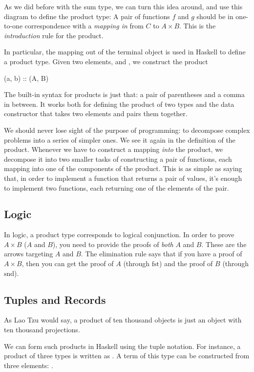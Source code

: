 \documentclass[DaoFP]{subfiles}
\begin{document}
As we did before with the sum type, we can turn this idea around, and use this diagram to define the product type: A pair of functions $f$ and $g$ should be in one-to-one correspondence with a \emph{mapping in} from $C$ to $A \times B$. This is the \emph{introduction} rule for the product.

In particular, the mapping out of the terminal object is used in Haskell to define a product type. Given two elements,  and , we construct the product 

\begin{haskell}
(a, b) :: (A, B)
\end{haskell}
The built-in syntax for products is just that: a pair of parentheses and a comma in between. It works both for defining the product of two types  and the data constructor  that takes two elements and pairs them together. 

We should never lose sight of the purpose of programming: to decompose complex problems into a series of simpler ones. We see it again in the definition of the product. Whenever we have to construct a mapping \emph{into} the product, we decompose it into two smaller tasks of constructing a pair of functions, each mapping into one of the components of the product. This is as simple as saying that, in order to implement a function that returns a pair of values, it's enough to implement two functions, each returning one of the elements of the pair.

\subsection{Logic}

In logic, a product type corresponds to logical conjunction. In order to prove $A \times B$ ($A$ and $B$), you need to provide the proofs of \emph{both} $A$ and $B$. These are the arrows targeting $A$ and $B$. The elimination rule says that if you have a proof of $A \times B$, then you can get the proof of $A$ (through $\text{fst}$) and the proof of $B$ (through $\text{snd}$).

\subsection{Tuples and Records}

As Lao Tzu would say, a product of ten thousand objects is just an object with ten thousand projections. 

We can form such products in Haskell using the tuple notation. For instance, a product of three types is written as . A term of this type can be constructed from three elements: . 
\end{document}
